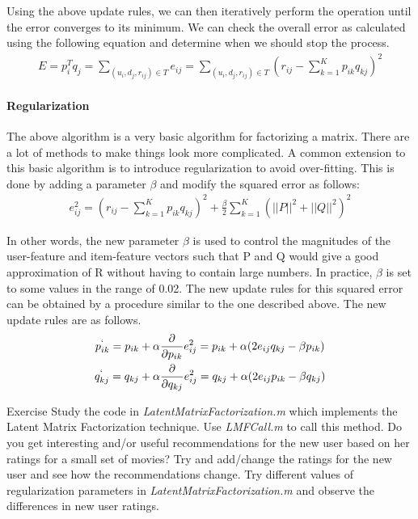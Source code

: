  Using the above update rules, we can then iteratively perform the operation until the error converges to its minimum. We can check the overall error as calculated using the following equation and determine when we should stop the process.
  \begin{gather*}
    E = p_i^{T}q_j = \sum_{(u_i,d_j,r_{ij})\in T} e_{ij} = \sum_{(u_i,d_j,r_{ij})\in T} (r_{ij} - \sum_{k=1}^{K}p_{ik}q_{kj})^2
  \end{gather*}
\paragraph{Regularization}

 The above algorithm is a very basic algorithm for factorizing a matrix. There are a lot of methods to make things look more complicated. A common extension to this basic algorithm is to introduce regularization to avoid over-fitting. This is done by adding a parameter $\beta$ and modify the squared error as follows:
  \begin{gather*}
    e_{ij}^2 = (r_{ij} - \sum_{k=1}^{K}p_{ik}q_{kj})^2 + \frac{\beta}{2}\sum_{k=1}^{K}(||P||^2 + ||Q||^2)^2
  \end{gather*}

 In other words, the new parameter $\beta$ is used to control the magnitudes of the user-feature and item-feature vectors such that P and Q would give a good approximation of R without having to contain large numbers. In practice, $\beta$ is set to some values in the range of 0.02. The new update rules for this squared error can be obtained by a procedure similar to the one described above. The new update rules are as follows.
\begin{gather*}
      p^`_{ik} = p_{ik} + \alpha\frac{\partial}{\partial p_{ik}}e_{ij}^2 = p_{ik} + \alpha(2e_{ij}q_{kj} - \beta p_{ik}) \\
      q^`_{kj} = q_{kj} + \alpha\frac{\partial}{\partial q_{kj}}e_{ij}^2 = q_{kj} + \alpha(2e_{ij}p_{ik} - \beta q_{kj})
  \end{gather*}
\begin{myremark}{Exercise }
Study the code in \textit{LatentMatrixFactorization.m} which implements the Latent Matrix Factorization technique. Use \textit{LMFCall.m} to call this method. Do you get interesting and/or useful recommendations for the new user based on her ratings for a small set of movies? Try and add/change the ratings for the new user and see how the recommendations change. Try different values of regularization parameters in \textit{LatentMatrixFactorization.m} and observe the differences in new user ratings.
\end{myremark}
